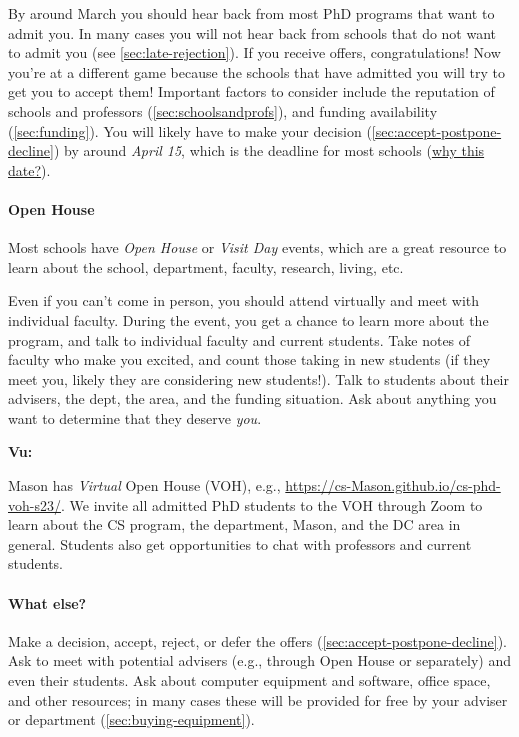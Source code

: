 \documentclass[oneside,11pt,dvipsnames]{book}
\newenvironment{commentbox}[1][]{
  \small
  \begin{mybox}
    {\small \textbf{#1}}
  }{
  \end{mybox}
}
\begin{document}
By around March you should hear back from most PhD programs that want to admit you.  In many cases you will not hear back from schools that do not want to admit you (see \autoref{sec:late-rejection}).
If you receive offers, congratulations!  Now you're at a different game because the schools that have admitted you will try to get you to accept them!  Important factors to consider include the reputation of schools and professors (\autoref{sec:schoolsandprofs}), and funding availability (\autoref{sec:funding}). You will likely have to make your decision (\autoref{sec:accept-postpone-decline}) by around \emph{April 15}, which is the deadline for most schools
(\href{https://cgsnet.org/wp-content/uploads/2024/01/CGS_April15_Resolution_Jan312024.pdf}{why this date?}).

\paragraph{Open House} Most schools have \emph{Open House} or \emph{Visit Day} events, which are a great resource to learn about the school, department, faculty, research, living, etc.

Even if you can't come in person, you should attend virtually and meet with individual faculty. During the event, you get a chance to learn more about the program, and talk to individual faculty and current students.  Take notes of faculty who make you excited, and count those taking in new students (if they meet you, likely they are considering new students!).  Talk to students about their advisers, the dept, the area, and the funding situation.  Ask about anything you want to determine that they deserve \emph{you}.

\begin{commentbox}[Vu:]
  Mason has \emph{Virtual} Open House (VOH), e.g., \url{https://cs-Mason.github.io/cs-phd-voh-s23/}. We invite all admitted PhD students to the VOH through Zoom to learn about the CS program, the department, Mason, and the DC area in general. Students also get opportunities to chat with professors and current students.
\end{commentbox}

\paragraph{What else?} Make a decision, accept, reject, or defer the offers  (\autoref{sec:accept-postpone-decline}). Ask to meet with potential advisers (e.g., through Open House or separately) and even their students. Ask about computer equipment and software, office space, and other resources; in many cases these will be provided for free by your adviser or department (\autoref{sec:buying-equipment}).
\end{document}
